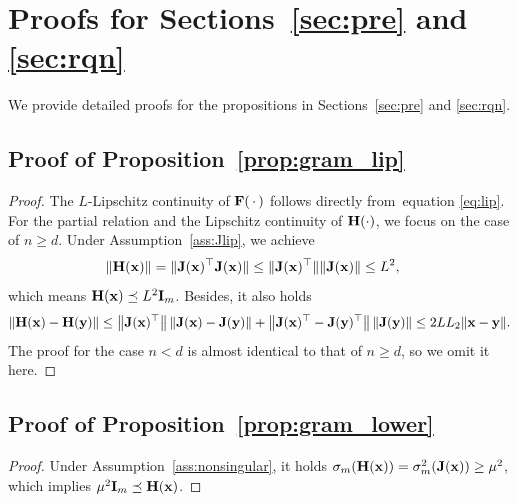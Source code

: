 \documentclass[11pt]{article}
\theoremstyle{plain}
\theoremstyle{definition}
\theoremstyle{remark}
\theoremstyle{plain}
\newcommand{\Norm}[1]{\left\| #1 \right\|}
\def\mH {{\bf H}}
\def\F{{\bf F}}
\def\H{{\bf H}}
\def\I{{\bf I}}
\def \J{{\bf J}}
\def\x{{\bf x}}
\def\y{{\bf y}}
\begin{document}

\appendix

\section{Proofs for Sections~\ref{sec:pre} and \ref{sec:rqn} }
\label{app:proofs_preliminaries}
We provide detailed proofs for the propositions in Sections~\ref{sec:pre} and \ref{sec:rqn}.

\subsection{Proof of Proposition~\ref{prop:gram_lip}}
\label{app:proof_prop_gram_lip}
\begin{proof}
The $L$-Lipschitz continuity of $\F(\,\cdot\,)$ follows directly from~equation \eqref{eq:lip}.
For the partial relation and the Lipschitz continuity of $\mH(\cdot)$, we focus on the case of $n\geq d$. 
Under Assumption~\ref{ass:Jlip}, we achieve
\begin{align*}
\|\H(\x)\|
&=\|\J(\x)^{\top}\J(\x)\|
\leq\|\J(\x)^{\top}\|\|\J(\x)\|
\leq L^2,
\end{align*}
which means $\H(\x)\preceq L^2\I_m$.
Besides, it also holds
\begin{align*}
    \|\H(\x)-\H(\y)\|\leq \big\|\J(\x)^{\top}\big\|\Norm{\J(\x)-\J(\y)}+\big\|\J(\x)^{\top}-\J(\y)^{\top}\big\|\Norm{\J(\y)}\leq 2LL_2\|\x-\y\|.
\end{align*}
The proof for the case $n<d$ is almost identical to that of $n\geq d$, so we omit it here.
\end{proof}

\subsection{Proof of Proposition~\ref{prop:gram_lower}}
\label{app:proof_prop_gram_lower}
\begin{proof}
Under Assumption~\ref{ass:nonsingular}, it holds
$\sigma_m(\H(\x))=\sigma_m^{2}(\J(\x))\geq\mu^2$,    
which implies $\mu^2\I_m\preceq\H(\x)$. 
\end{proof}

\end{document}
